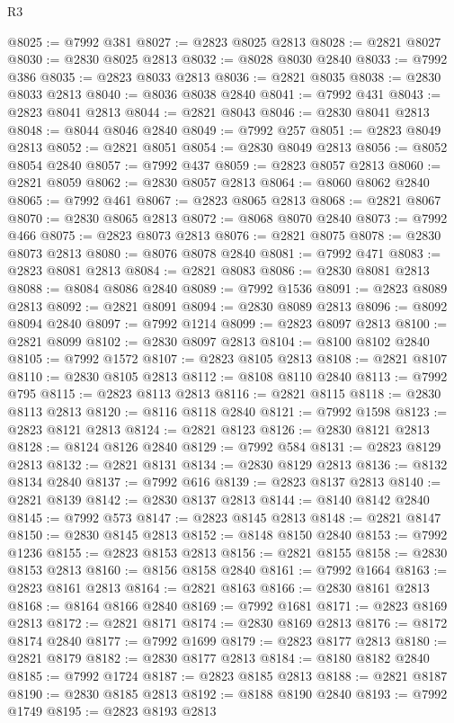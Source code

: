 \begin{lexlean}{R3}
\begin{coremodule}
@8025 := @7992 @381
@8027 := @2823 @8025 @2813
@8028 := @2821 @8027
@8030 := @2830 @8025 @2813
@8032 := @8028 @8030 @2840
@8033 := @7992 @386
@8035 := @2823 @8033 @2813
@8036 := @2821 @8035
@8038 := @2830 @8033 @2813
@8040 := @8036 @8038 @2840
@8041 := @7992 @431
@8043 := @2823 @8041 @2813
@8044 := @2821 @8043
@8046 := @2830 @8041 @2813
@8048 := @8044 @8046 @2840
@8049 := @7992 @257
@8051 := @2823 @8049 @2813
@8052 := @2821 @8051
@8054 := @2830 @8049 @2813
@8056 := @8052 @8054 @2840
@8057 := @7992 @437
@8059 := @2823 @8057 @2813
@8060 := @2821 @8059
@8062 := @2830 @8057 @2813
@8064 := @8060 @8062 @2840
@8065 := @7992 @461
@8067 := @2823 @8065 @2813
@8068 := @2821 @8067
@8070 := @2830 @8065 @2813
@8072 := @8068 @8070 @2840
@8073 := @7992 @466
@8075 := @2823 @8073 @2813
@8076 := @2821 @8075
@8078 := @2830 @8073 @2813
@8080 := @8076 @8078 @2840
@8081 := @7992 @471
@8083 := @2823 @8081 @2813
@8084 := @2821 @8083
@8086 := @2830 @8081 @2813
@8088 := @8084 @8086 @2840
@8089 := @7992 @1536
@8091 := @2823 @8089 @2813
@8092 := @2821 @8091
@8094 := @2830 @8089 @2813
@8096 := @8092 @8094 @2840
@8097 := @7992 @1214
@8099 := @2823 @8097 @2813
@8100 := @2821 @8099
@8102 := @2830 @8097 @2813
@8104 := @8100 @8102 @2840
@8105 := @7992 @1572
@8107 := @2823 @8105 @2813
@8108 := @2821 @8107
@8110 := @2830 @8105 @2813
@8112 := @8108 @8110 @2840
@8113 := @7992 @795
@8115 := @2823 @8113 @2813
@8116 := @2821 @8115
@8118 := @2830 @8113 @2813
@8120 := @8116 @8118 @2840
@8121 := @7992 @1598
@8123 := @2823 @8121 @2813
@8124 := @2821 @8123
@8126 := @2830 @8121 @2813
@8128 := @8124 @8126 @2840
@8129 := @7992 @584
@8131 := @2823 @8129 @2813
@8132 := @2821 @8131
@8134 := @2830 @8129 @2813
@8136 := @8132 @8134 @2840
@8137 := @7992 @616
@8139 := @2823 @8137 @2813
@8140 := @2821 @8139
@8142 := @2830 @8137 @2813
@8144 := @8140 @8142 @2840
@8145 := @7992 @573
@8147 := @2823 @8145 @2813
@8148 := @2821 @8147
@8150 := @2830 @8145 @2813
@8152 := @8148 @8150 @2840
@8153 := @7992 @1236
@8155 := @2823 @8153 @2813
@8156 := @2821 @8155
@8158 := @2830 @8153 @2813
@8160 := @8156 @8158 @2840
@8161 := @7992 @1664
@8163 := @2823 @8161 @2813
@8164 := @2821 @8163
@8166 := @2830 @8161 @2813
@8168 := @8164 @8166 @2840
@8169 := @7992 @1681
@8171 := @2823 @8169 @2813
@8172 := @2821 @8171
@8174 := @2830 @8169 @2813
@8176 := @8172 @8174 @2840
@8177 := @7992 @1699
@8179 := @2823 @8177 @2813
@8180 := @2821 @8179
@8182 := @2830 @8177 @2813
@8184 := @8180 @8182 @2840
@8185 := @7992 @1724
@8187 := @2823 @8185 @2813
@8188 := @2821 @8187
@8190 := @2830 @8185 @2813
@8192 := @8188 @8190 @2840
@8193 := @7992 @1749
@8195 := @2823 @8193 @2813

\end{coremodule}
\end{lexlean}
